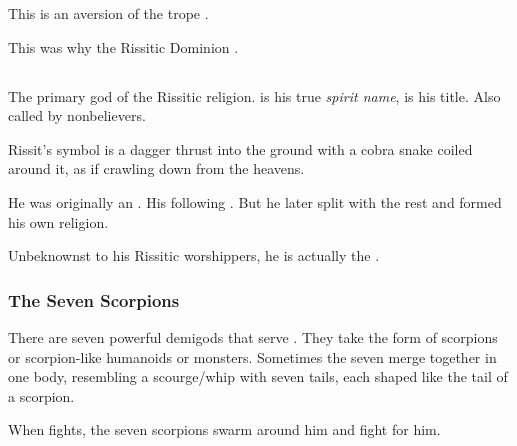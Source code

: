 This is an aversion of the trope .

This was why the Rissitic Dominion .









\subsection{\HriistN} 
\index{\HriistN}
The primary god of the Rissitic religion. 
\quo{\Hriist} is his true \emph{spirit name}, \quo{\Nechsain} is his title. 
Also called  by nonbelievers. 

Rissit's symbol is a dagger thrust into the ground with a cobra snake coiled around it, as if crawling down from the heavens. 

He was originally an . 
His following . 
But he later split with the rest and formed his own religion. 

Unbeknownst to his Rissitic worshippers, he is actually the \dragon{} . 



\subsubsection{The Seven Scorpions}
There are seven powerful \daemonic{} demigods that serve \Nechsain. They take the form of scorpions or scorpion-like humanoids or monsters. Sometimes the seven merge together in one body, resembling a scourge/whip with seven tails, each shaped like the tail of a scorpion. 

When \Nechsain{} fights, the seven scorpions swarm around him and fight for him.















